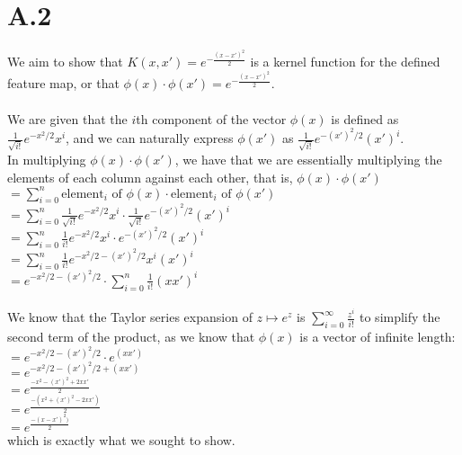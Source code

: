\documentclass{article}
\newcommand{\1}{\mathbf{1}}
\begin{document}
\section*{A.2}
{\Large

We aim to show that $K(x, x') = e^{-\frac{(x-x')^2}{2}}$ is a kernel function for the defined feature map, or that $\phi (x) \cdot \phi (x') = e^{-\frac{(x-x')^2}{2}}$. \\ \\
We are given that the $i$th component of the vector $\phi(x)$ is defined as $\frac{1}{\sqrt{i!}} e^{-x^2/2} x^i$, and we can naturally express $\phi(x')$ as  $\frac{1}{\sqrt{i!}} e^{-(x')^2 / 2} (x')^i$.
\\
In multiplying $\phi(x) \cdot \phi(x')$, we have that we are essentially multiplying the elements of each column against each other, that is, $\phi(x) \cdot \phi(x')$ \\
$= \sum_{i=0}^{n} \text{element}_i \text{ of } \phi(x) \cdot \text{element}_i \text{ of } \phi(x')$ \\
$= \sum_{i=0}^{n} \frac{1}{\sqrt{i!}} e^{-x^2/2} x^i \cdot \frac{1}{\sqrt{i!}} e^{-(x')^2 / 2} (x')^i$ \\
$= \sum_{i=0}^{n} \frac{1}{i!} e^{-x^2/2} x^i \cdot e^{-(x')^2 / 2} (x')^i$ \\
$= \sum_{i=0}^{n} \frac{1}{i!} e^{-x^2/2 - (x')^2 / 2} x^i (x')^i$ \\
$= e^{-x^2/2 - (x')^2 / 2} \cdot \sum_{i=0}^{n} \frac{1}{i!} (xx')^i$ \\ \\
We know that the Taylor series expansion of $z \mapsto e^z$ is $\sum_{i=0}^{\infty} \frac{z^i}{i!}$ to simplify the second term of the product, as we know that $\phi(x)$ is a vector of infinite length: \\
$= e^{-x^2/2 - (x')^2 / 2} \cdot e^{(xx')}$ \\
$= e^{-x^2/2 - (x')^2 / 2 + (xx')} $ \\
$= e^{\frac{-x^2 - (x')^2 + 2xx'}{2}} $ \\
$= e^{\frac{-(x^2 + (x')^2 - 2xx')}{2}} $ \\
$= e^{\frac{-(x - x')^2)}{2}} $ \\
which is exactly what we sought to show.

}
\end{document}
